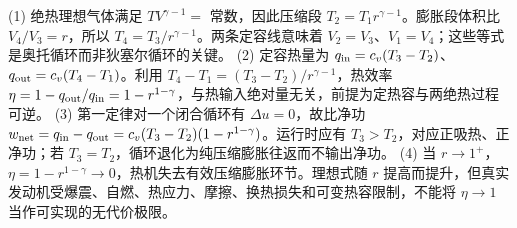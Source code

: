 (1) 绝热理想气体满足 \(TV^{\gamma-1}=\) 常数，因此压缩段 \(T_2=T_1r^{\gamma-1}\)。膨胀段体积比 \(V_4/V_3=r\)，所以 \(T_4=T_3/r^{\gamma-1}\)。两条定容线意味着 \(V_2=V_3\)、\(V_1=V_4\)；这些等式是奥托循环而非狄塞尔循环的关键。
(2) 定容热量为 \(q_{\rm in}=c_v(T_3-T_2)\)、\(q_{\rm out}=c_v(T_4-T_1)\)。利用 \(T_4-T_1=(T_3-T_2)/r^{\gamma-1}\)，热效率 \(\eta=1-q_{\rm out}/q_{\rm in}=1-r^{1-\gamma}\)，与热输入绝对量无关，前提为定热容与两绝热过程可逆。
(3) 第一定律对一个闭合循环有 \(\Delta u=0\)，故比净功 \(w_{\rm net}=q_{\rm in}-q_{\rm out}=c_v(T_3-T_2)(1-r^{1-\gamma})\)。运行时应有 \(T_3>T_2\)，对应正吸热、正净功；若 \(T_3=T_2\)，循环退化为纯压缩膨胀往返而不输出净功。
(4) 当 \(r\to1^+\)，\(\eta=1-r^{1-\gamma}\to0\)，热机失去有效压缩膨胀环节。理想式随 \(r\) 提高而提升，但真实发动机受爆震、自燃、热应力、摩擦、换热损失和可变热容限制，不能将 \(\eta\to1\) 当作可实现的无代价极限。
